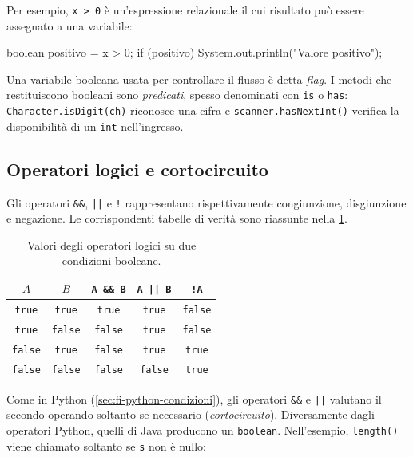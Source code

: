 Per esempio, \texttt{x > 0} è un'espressione relazionale il cui
risultato può essere assegnato a una variabile:

\begin{unipdcode}[language=Java]
boolean positivo = x > 0;
if (positivo) {
    System.out.println("Valore positivo");
}
\end{unipdcode}

Una variabile booleana usata per controllare il flusso è detta
\emph{flag}. I metodi che restituiscono booleani sono
\emph{predicati}, spesso denominati con \texttt{is} o \texttt{has}:
\texttt{Character.isDigit(ch)} riconosce una cifra e
\texttt{scanner.hasNextInt()} verifica la disponibilità di un
\texttt{int} nell'ingresso.

\subsection{Operatori logici e cortocircuito}
\label{sec:fi-java-cicli-logici}

Gli operatori \texttt{\&\&}, \texttt{||} e \texttt{!}
rappresentano rispettivamente congiunzione, disgiunzione e
negazione. Le corrispondenti tabelle di verità sono riassunte
nella \cref{tab:fi-java-cicli-booleani}.

\begin{table}[htbp]
\centering
\begin{tabular}{ccccc}
\toprule
\(A\) & \(B\) & \texttt{A \&\& B} & \texttt{A || B} & \texttt{!A} \\
\midrule
\texttt{true} & \texttt{true} & \texttt{true} & \texttt{true} & \texttt{false} \\
\texttt{true} & \texttt{false} & \texttt{false} & \texttt{true} & \texttt{false} \\
\texttt{false} & \texttt{true} & \texttt{false} & \texttt{true} & \texttt{true} \\
\texttt{false} & \texttt{false} & \texttt{false} & \texttt{false} & \texttt{true} \\
\bottomrule
\end{tabular}
\caption{Valori degli operatori logici su due condizioni booleane.}
\label{tab:fi-java-cicli-booleani}
\end{table}

Come in Python (\cref{sec:fi-python-condizioni}), gli operatori
\texttt{\&\&} e \texttt{||} valutano il secondo operando
soltanto se necessario (\emph{cortocircuito}). Diversamente dagli
operatori Python, quelli di Java producono un \texttt{boolean}.
Nell'esempio, \texttt{length()} viene chiamato soltanto se
\texttt{s} non è nullo:

